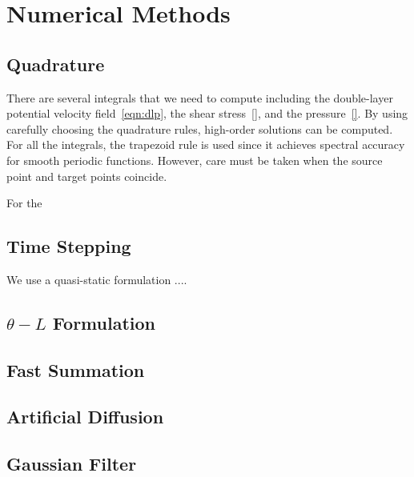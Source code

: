 \documentclass[preprint, 10pt]{elsarticle}
\begin{document}
\section{Numerical Methods\label{s:method}} 


\subsection{Quadrature} 
There are several integrals that we need to compute including the
double-layer potential velocity field~\eqref{eqn:dlp}, the shear
stress~\eqref{}, and the pressure~\eqref{}.  By using carefully choosing
the quadrature rules, high-order solutions can be computed.  For all the
integrals, the trapezoid rule is used since it achieves spectral
accuracy for smooth periodic functions.  However, care must be taken
when the source point and target points coincide.

For the 



\subsection{Time Stepping} 
We use a quasi-static formulation ....

\subsection{$\theta-L$ Formulation} 


\subsection{Fast Summation} 

\subsection{Artificial Diffusion} 

\subsection{Gaussian Filter} 
\end{document}
